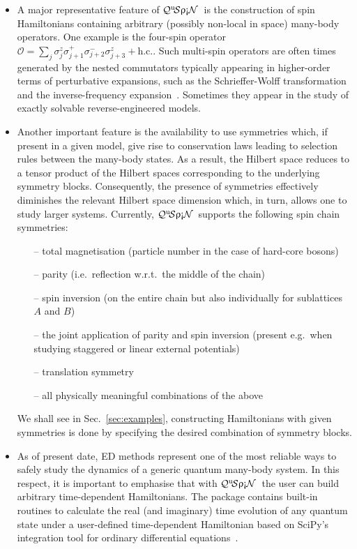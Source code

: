 \documentclass{SciPost}
\newcommand\0{\scalebox{-1}[1]{0}}
\newcommand{\qspin}{$\mathcal{Q}^{\mathrm{u}}\!\mathcal{S}\uprho\mathrm{\text{\textexclamdown}}\mathcal{N}$}
\begin{document}
\begin{itemize}
	\item A major representative feature of \qspin\ is the construction of spin Hamiltonians containing arbitrary (possibly non-local in space) many-body operators. One example is the four-spin operator $\mathcal{O}= \sum_j \sigma^z_{j}\sigma^+_{j+1}\sigma^-_{j+2}\sigma^z_{j+3} + \mathrm{h.c.}$. Such multi-spin operators are often times generated by the nested commutators typically appearing in higher-order terms of perturbative expansions, such as the Schrieffer-Wolff transformation~\cite{schrieffer_66,bravyi_11,bukov_SW} and the inverse-frequency expansion~\cite{goldman_14,bukov_14}. Sometimes they appear in the study of exactly solvable reverse-engineered models.
	\item Another important feature is the availability to use symmetries which, if present in a given model, give rise to conservation laws leading to selection rules between the many-body states. As a result, the Hilbert space reduces to a tensor product of the Hilbert spaces corresponding to the underlying symmetry blocks. Consequently, the presence of symmetries effectively diminishes the relevant Hilbert space dimension which, in turn, allows one to study larger systems. Currently, \qspin\ supports the following spin chain symmetries:
	\begin{itemize}
		\item[--] total magnetisation (particle number in the case of hard-core bosons)
		\item[--] parity (i.e.~reflection w.r.t.~the middle of the chain)
		\item[--] spin inversion (on the entire chain but also individually for sublattices $A$ and $B$)
		\item[--] the joint application of parity and spin inversion (present e.g.~when studying staggered or linear external potentials)
		\item[--] translation symmetry
		\item[--] all physically meaningful combinations of the above
	\end{itemize}
	We shall see in Sec.~\ref{sec:examples}, constructing Hamiltonians with given symmetries is done by specifying the desired combination of symmetry blocks.
	\item As of present date, ED methods represent one of the most reliable ways to safely study the dynamics of a generic quantum many-body system. In this respect, it is important to emphasise that with \qspin\ the user can build arbitrary time-dependent Hamiltonians. The package contains built-in routines to calculate the real (and imaginary) time evolution of any quantum state under a user-defined time-dependent Hamiltonian based on SciPy's integration tool for ordinary differential equations~\cite{SciPy_package}.

\end{itemize}
\end{document}
